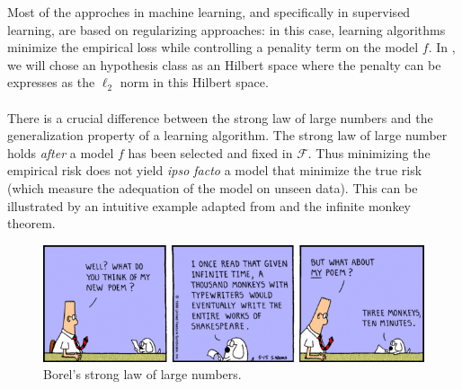 Most of the approches in machine learning, and specifically in supervised learning, are based on regularizing approaches: in this case, learning algorithms minimize the empirical loss while controlling a penality term on the model $f$. In , we will chose an hypothesis class as an Hilbert space where the penalty can be expresses as the $\ell_2$ norm in this Hilbert space.


\paragraph{}
There is a crucial difference between the strong law of large numbers and the
generalization property of a learning algorithm. The strong law of large number
holds \emph{after} a model $f$ has been selected and fixed in $\mathcal{F}$.
Thus minimizing the empirical risk does not yield \emph{ipso facto} a model that
minimize the true risk (which measure the adequation of the model on unseen
data). This can be illustrated by an intuitive example adapted from
\citet[page 64]{cornuejols2011apprentissage} and the infinite monkey theorem.
\begin{figure}
    \centering\includegraphics[width=\textwidth]{./gfx/infinite_monkey.jpg}
    \caption{Borel's strong law of large numbers.}
\end{figure}
